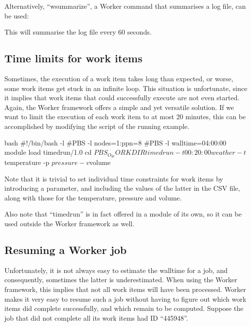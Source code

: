 \begin{prompt}
\end{prompt}

Alternatively, ``wsummarize'', a Worker command that summarises a log file, can be used:
\begin{prompt}
\end{prompt}

This will summarise the log file every 60 seconds.

\subsection{Time limits for work items}

Sometimes, the execution of a work item takes long than expected, or worse,
some work items get stuck in an infinite loop. This situation is unfortunate,
since it implies that work items that could successfully execute are not even
started. Again, the Worker framework offers a simple and yet versatile
solution. If we want to limit the execution of each work item to at most 20
minutes, this can be accomplished by modifying the script of the running
example.

\begin{code}{bash}
#!/bin/bash -l
#PBS -l nodes=1:ppn=8
#PBS -l walltime=04:00:00
module load timedrun/1.0
cd $PBS_O_WORKDIR
timedrun -t 00:20:00 weather -t $temperature  -p $pressure  -v $volume
\end{code}

Note that it is trivial to set individual time constraints for work items by
introducing a parameter, and including the values of the latter in the CSV
file, along with those for the temperature, pressure and volume.

Also note that ``timedrun'' is in fact offered in a module of its own, so it can
be used outside the Worker framework as well.

\subsection{Resuming a Worker job}

Unfortunately, it is not always easy to estimate the walltime for a job, and
consequently, sometimes the latter is underestimated. When using the Worker
framework, this implies that not all work items will have been processed.
Worker makes it very easy to resume such a job without having to figure out
which work items did complete successfully, and which remain to be computed.
Suppose the job that did not complete all its work items had ID ``445948''.

